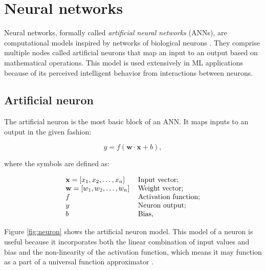 \section{Neural networks}

Neural networks, formally called \emph{artificial neural networks} (ANNs), are computational models inspired by networks of biological neurons \cite{Puri2016}. They comprise multiple nodes called artificial neurons that map an input to an output based on mathematical operations. This model is used extensively in ML applications because of its perceived intelligent behavior from interactions between neurons.

\subsection{Artificial neuron}

The artificial neuron is the most basic block of an ANN. It maps inputs to an output in the given fashion:

\begin{equation} \label{eq:neuron_eq}
	y = f(\mathbf{w} \cdot \mathbf{x} + b),
\end{equation}

where the symbols are defined as:

\begin{equation} \label{eq:neuron_symbols}
	\begin{tabular}{ll}
		$\mathbf{x} = [x_1, x_2, \ldots, x_n]$ & Input vector;\\
		$\mathbf{w} = [w_1, w_2, \ldots, w_n]$ & Weight vector;\\
		$f$ & Activation function; \\
		$y$ & Neuron output; \\
		$b$ & Bias,
	\end{tabular}
\end{equation}

Figure \ref{fig:neuron} shows the artificial neuron model. This model of a neuron is useful because it incorporates both the linear combination of input values and bias and the non-linearity of the activation function, which means it may function as a part of a universal function approximator \cite{HORNIK1989}.

